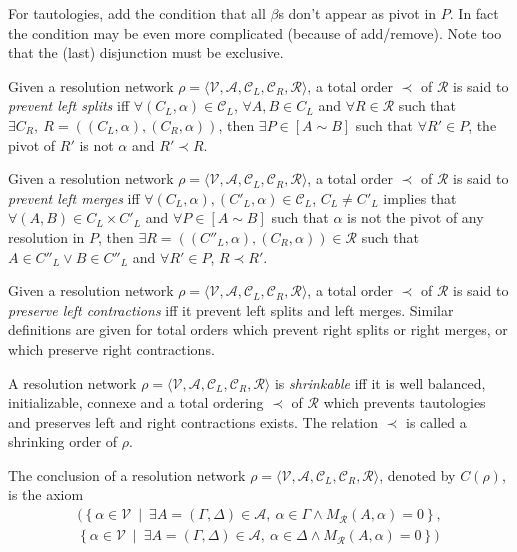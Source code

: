 \documentclass{article}
\newenvironment{comment}{\color{teal}}{}
\newcommand{\ens}[2]{\left\{ #1 ~ \middle| ~ #2 \right\}}
\newcommand{\varSet}{\mathcal{V}}
\newcommand{\axiomSet}{\mathcal{A}}
\newcommand{\conSet}{\mathcal{C}}
\newcommand{\resoSet}{\mathcal{R}}
\newcommand{\resoNet}{\rho}
\newcommand{\resoOrd}{\prec}
\newcommand{\connected}{\sim}
\newcommand{\cpath}[2]{\left[ #1 \connected #2 \right]}
\newcommand{\nConclusion}[1]{C(#1)} %
\newcommand{\connectivity}[3]{M_{#3} \left( #1 , #2 \right)}
\begin{document}
\begin{comment}
  For tautologies, add the condition that all $\beta$s don't appear as pivot in $P$. In fact the
  condition may be even more complicated (because of add/remove). Note too that the (last)
  disjunction must be exclusive.
\end{comment}

Given a resolution network $\resoNet = \langle \varSet, \axiomSet, \conSet_L, \conSet_R, \resoSet
\rangle$, a total order $\resoOrd$ of $\resoSet$ is said to \emph{prevent left splits} iff
$\forall (C_L,\alpha) \in \conSet_L$, $\forall A, B \in C_L$ and
$\forall R \in \resoSet$ such that $\exists C_R ,~ R = ((C_L,\alpha),(C_R,\alpha))$, then
$\exists P \in \cpath{A}{B}$ such that $\forall R' \in P$, the pivot of $R'$ is
not $\alpha$ and $R' \resoOrd R$.

Given a resolution network $\resoNet = \langle \varSet, \axiomSet, \conSet_L, \conSet_R, \resoSet
\rangle$, a total order $\resoOrd$ of $\resoSet$ is said to \emph{prevent left merges} iff
$\forall (C_L,\alpha), (C'_L,\alpha) \in \conSet_L$, $C_L \neq C'_L$ implies that
$\forall (A,B) \in C_L \times C'_L$ and
$\forall P \in \cpath{A}{B}$ such that $\alpha$ is not the pivot of any resolution in $P$, then
$\exists R = ((C''_L,\alpha),(C_R,\alpha)) \in \resoSet$ such that
$A \in C''_L \vee B \in C''_L$ and $\forall R' \in P$, $R \resoOrd R'$.

Given a resolution network $\resoNet = \langle \varSet, \axiomSet, \conSet_L, \conSet_R, \resoSet
\rangle$, a total order $\resoOrd$ of $\resoSet$ is said to \emph{preserve left contractions} iff
it prevent left splits and left merges. Similar definitions are given for total orders which prevent
right splits or right merges, or which preserve right contractions.

A resolution network $\rho = \langle \varSet, \axiomSet, \conSet_L, \conSet_R, \resoSet \rangle$ is
\emph{shrinkable} iff it is well balanced, initializable, connexe and a total ordering $\resoOrd$ of
$\resoSet$ which prevents tautologies and preserves left and right contractions exists. The relation
$\resoOrd$ is called a shrinking order of $\rho$.

The conclusion of a resolution network $\rho = \langle \varSet, \axiomSet, \conSet_L, \conSet_R,
\resoSet \rangle$, denoted by $\nConclusion{\rho}$, is the axiom
\begin{multline*}
(\ens{\alpha \in \varSet}{\exists A = (\Gamma,\Delta) \in \axiomSet ,~ \alpha \in \Gamma \wedge
\connectivity{A}{\alpha}{\resoSet} = 0}, \\
 \ens{\alpha \in \varSet}{\exists A = (\Gamma,\Delta) \in \axiomSet ,~ \alpha \in \Delta \wedge \connectivity{A}{\alpha}{\resoSet} = 0})
\end{multline*}
\end{document}
